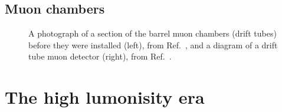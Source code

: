 \subsection{Muon chambers}

\begin{figure}[htb]
    \centering
    \quad
    \caption{
        A photograph of a section of the barrel muon chambers (drift tubes) before they were installed (left), from Ref.~\cite{Hoch:1274451}, and a diagram of a drift tube muon detector (right), from Ref.~\cite{CMSWebMuonDT}. 
    }
    \label{fig:cms_muon}
\end{figure}

\clearpage

\section{The high lumonisity era}

